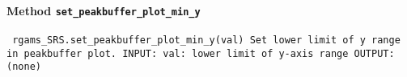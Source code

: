 \paragraph{Method \texttt{set_peakbuffer_plot_min_y}}
\vspace{1ex}
\texttt{\newline
rgams_SRS.set_peakbuffer_plot_min_y(val)\newline
\newline
Set lower limit of y range in peakbuffer plot.\newline
\newline
INPUT:\newline
val: lower limit of y-axis range\newline
\newline
OUTPUT:\newline
(none)\newline
\newline
}

